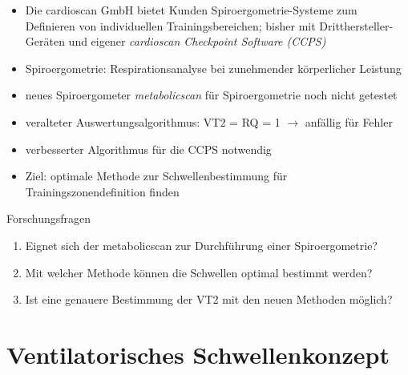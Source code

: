 \documentclass[colorBG,slideColor,8pt]{beamer}
\begin{document}
\begin{frame}
\begin{itemize}
	\item Die cardioscan GmbH bietet Kunden Spiroergometrie-Systeme zum Definieren von individuellen Trainingsbereichen; bisher mit Dritthersteller-Geräten und eigener \textsl{cardioscan Checkpoint Software (CCPS)}
	\item Spiroergometrie: Respirationsanalyse bei zunehmender körperlicher Leistung
	\item neues Spiroergometer \textsl{metabolicscan} für Spiroergometrie noch nicht getestet
	\item veralteter Auswertungsalgorithmus: VT2 = RQ = 1 $\rightarrow$ anfällig für Fehler
	\item verbesserter Algorithmus für die CCPS notwendig
	\item Ziel: optimale Methode zur Schwellenbestimmung für Trainingszonendefinition finden
\end{itemize}
\begin{block}{Forschungsfragen}
	\begin{enumerate}
		\item Eignet sich der metabolicscan zur Durchführung einer Spiroergometrie?
		\item Mit welcher Methode können die Schwellen optimal bestimmt werden?
		\item Ist eine genauere Bestimmung der VT2 mit den neuen Methoden möglich?
	\end{enumerate}
\end{block}
\end{frame}


\section{Ventilatorisches Schwellenkonzept}
\begin{frame}
\tableofcontents[currentsection]
\end{frame}
\end{document}
